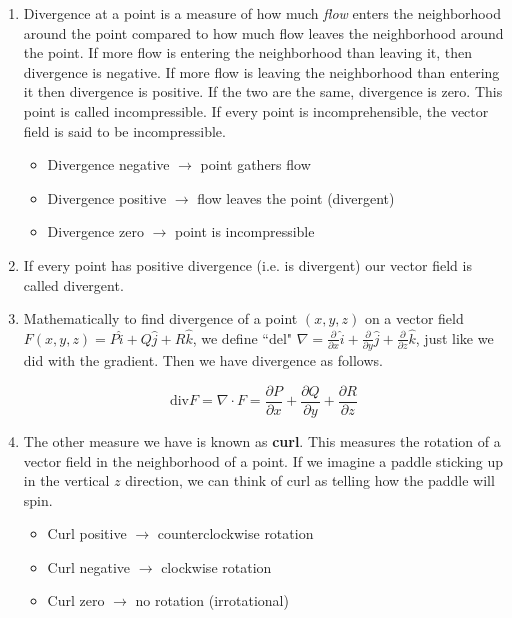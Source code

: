 \documentclass[11pt]{article}
\begin{document}
\begin{enumerate}
\item Divergence at a point is a measure of how much \emph{flow} enters the neighborhood around the point compared to how much flow leaves the neighborhood around the point. If more flow is entering the neighborhood than leaving it, then divergence is negative. If more flow is leaving the neighborhood than entering it then divergence is positive. If the two are the same, divergence is zero. This point is called incompressible. If every point is incomprehensible, the vector field is said to be incompressible.

\begin{itemize}
    \item Divergence negative $\to$ point gathers flow
    \item Divergence positive $\to$ flow leaves the point (divergent)
    \item Divergence zero $
    \to$ point is incompressible 
\end{itemize}

\item If every point has positive divergence (i.e. is divergent) our vector field is called divergent.

\item Mathematically to find divergence of a point $(x,y,z)$ on a vector field $F(x,y,z) = P\hat{i} + Q\hat{j} + R\hat{k}$, we define ``del" $\nabla = \frac{\partial}{\partial x}\hat{i} + \frac{\partial}{\partial y}\hat{j}+ \frac{\partial}{\partial z}\hat{k}$, just like we did with the gradient. Then we have divergence as follows.

\begin{equation*}
    \text{div}F = \nabla \cdot F = \frac{\partial P}{\partial x}+ \frac{\partial Q}{\partial y} + \frac{\partial R}{\partial z}
\end{equation*}


\item The other measure we have is known as \textbf{curl}. This measures the rotation of a vector field in the neighborhood of a point. If we imagine a paddle sticking up in the vertical $z$ direction, we can think of curl as telling how the paddle will spin. 

\begin{itemize}
    \item Curl positive $\to$ counterclockwise rotation
    \item Curl negative $\to$ clockwise rotation
    \item Curl zero $\to$ no rotation (irrotational)
\end{itemize}


\end{enumerate}
\end{document}
